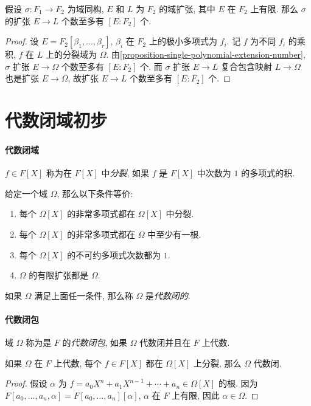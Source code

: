 \begin{corollary}
  \label{corollary-finite-extension-homomorphisms-numbers}
  假设 \( \sigma: F_1 \to F_2 \) 为域同构, \( E \) 和 \( L \) 为 \( F_2 \)
  的域扩张, 其中 \( E \) 在 \( F_2 \) 上有限.
  那么 \( \sigma \) 的扩张 \( E \to L \) 个数至多有 \( [E: F_2] \) 个.
\end{corollary}
\begin{proof}
  设 \( E = F_2[\beta_1, \ldots, \beta_r] \), \( \beta_i \) 在 \( F_2 \)
  上的极小多项式为 \( f_i \).
  记 \( f \) 为不同 \( f_i \) 的乘积, \( f \) 在 \( L \) 上的分裂域为 \( \Omega
  \).
  由\cref{proposition-single-polynomial-extension-number}, \( \sigma \) 扩张
  \( E \to \Omega \) 个数至多有 \( [E : F_2] \) 个.
  而 \( \sigma \) 扩张 \( E \to L \) 复合包含映射 \( L \to \Omega \) 也是扩张 \(
  E \to \Omega \), 故扩张 \( E \to L \) 个数至多有 \( [E: F_2] \) 个.
\end{proof}

\section{代数闭域初步}

\paragraph{代数闭域} \( f \in F[X] \) 称为在 \( F[X] \) 中\emph{分裂}, 如果 \( f \) 是 \( F[X] \)
中次数为 \( 1 \) 的多项式的积.

\begin{proposition}
  给定一个域 \( \Omega \), 那么以下条件等价:
  \begin{enumerate}
    \item 每个 \( \Omega[X] \) 的非常多项式都在 \( \Omega[X] \) 中分裂.
    \item 每个 \( \Omega[X] \) 的非常多项式都在 \( \Omega \) 中至少有一根.
    \item 每个 \( \Omega[X] \) 的不可约多项式次数都为 \( 1 \).
    \item \( \Omega \) 的有限扩张都是 \( \Omega \).
  \end{enumerate}
  如果 \( \Omega \) 满足上面任一条件, 那么称 \( \Omega \) 是\emph{代数闭的}.
\end{proposition}

\paragraph{代数闭包} 域 \( \Omega \) 称为是 \( F \) 的\emph{代数闭包}, 如果 \(
\Omega \) 代数闭并且在 \( F \) 上代数.
\begin{proposition}
  \label{proposition-algebraic-closure-as-a-splitting-field}
  如果 \( \Omega \) 在 \( F \) 上代数, 每个 \( f \in F[X] \) 都在 \( \Omega[X]
  \) 上分裂, 那么 \( \Omega \) 代数闭.
\end{proposition}
\begin{proof}
  假设 \( \alpha \) 为 \( f = a_0X^n + a_1 X^{n - 1} + \cdots + a_n \in
  \Omega[X] \) 的根.
  因为 \( F[a_0, \ldots, a_n, \alpha] = F[a_0,\ldots, a_n][\alpha] \), \( \alpha
  \) 在 \( F \) 上有限, 因此 \( \alpha \in \Omega \).
\end{proof}

